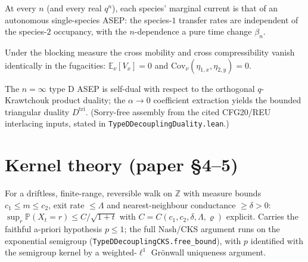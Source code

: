 \begin{proposition}\label{prop:decouple}
  \leanok
  At every $n$ (and every real $q^n$), each species' marginal current is that of an
  autonomous single-species ASEP: the species-$1$ transfer rates are independent of
  the species-$2$ occupancy, with the $n$-dependence a pure time change $\beta_n$.
\end{proposition}

\begin{proposition}\label{prop:cross}
  \leanok
  Under the blocking measure the cross mobility and cross compressibility vanish
  identically in the fugacities: $\mathbb E_\nu[V_x] = 0$ and
  $\mathrm{Cov}_\nu(\eta_{1,x},\eta_{2,y}) = 0$.
\end{proposition}

\begin{theorem}\label{thm:dual}
  \leanok
  The $n=\infty$ type D ASEP is self-dual with respect to the orthogonal
  $q$-Krawtchouk product duality; the $\alpha\to0$ coefficient extraction yields the
  bounded triangular duality $D^{\mathrm{tri}}$.  (Sorry-free assembly from the cited
  CFG20/REU interlacing inputs, stated in \texttt{TypeDDecouplingDuality.lean}.)
\end{theorem}

\chapter{Kernel theory (paper \S4--5)}

\begin{lemma}\label{lem:free}
  \leanok
  For a driftless, finite-range, reversible walk on $\mathbb Z$ with measure bounds
  $c_1 \le m \le c_2$, exit rate $\le \Lambda$ and nearest-neighbour conductance
  $\ge \delta > 0$: $\sup_r \mathbb P(X_t = r) \le C/\sqrt{1+t}$ with
  $C = C(c_1,c_2,\delta,\Lambda,\varrho)$ explicit.  Carries the faithful a-priori
  hypothesis $p \le 1$; the full Nash/CKS argument runs on the exponential semigroup
  (\texttt{TypeDDecouplingCKS.free\_bound}), with $p$ identified with the semigroup
  kernel by a weighted-$\ell^1$ Gr\"onwall uniqueness argument.
\end{lemma}

